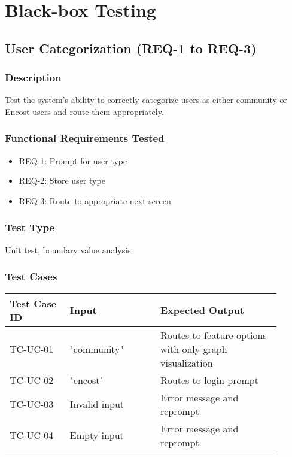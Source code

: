 \documentclass{scrreprt}
\begin{document}
\chapter{Black-box Testing}

\section{User Categorization (REQ-1 to REQ-3)}
\subsection{Description}
Test the system's ability to correctly categorize users as either community or Encost users and route them appropriately.

\subsection{Functional Requirements Tested}
\begin{itemize}
    \item REQ-1: Prompt for user type
    \item REQ-2: Store user type
    \item REQ-3: Route to appropriate next screen
\end{itemize}

\subsection{Test Type}
Unit test, boundary value analysis

\subsection{Test Cases}
\begin{table}[h!]
\centering
\begin{tabular}{|p{0.2\linewidth}|p{0.3\linewidth}|p{0.4\linewidth}|}
    \hline
    Test Case ID & Input & Expected Output \\
    \hline
    TC-UC-01 & "community" & Routes to feature options with only graph visualization \\
    \hline
    TC-UC-02 & "encost" & Routes to login prompt \\
    \hline
    TC-UC-03 & Invalid input & Error message and reprompt \\
    \hline
    TC-UC-04 & Empty input & Error message and reprompt \\
    \hline
\end{tabular}
\end{table}
\end{document}
